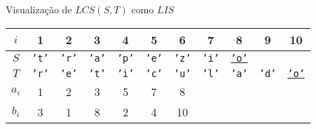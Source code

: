 \begin{frame}[fragile]{Visualização de $LCS(S, T)$ como $LIS$}

    \begin{table}
        \centering

        \begin{tabular}{c|cccccccccc} 
        \hline 
        $i$ & 1 & 2 & 3 & 4 & 5 & 6 & 7 & 8 & 9 & 10\\
        \hline
        $S$
        & {\textcolor{blue!80!black}{\texttt{'t'}}}
        & {\textcolor{blue!80!black}{\texttt{'r'}}}
        & {\textcolor{blue!80!black}{\texttt{'a'}}}
        & \textcolor{blue!80!black}{\texttt{'p'}}
        & {\textcolor{blue!80!black}{\texttt{'e'}}}
        & \textcolor{blue!80!black}{\texttt{'z'}}
        & {\textcolor{blue!80!black}{\texttt{'i'}}}
        & \underline{\textcolor{blue!80!black}{\texttt{'o'}}} \\
        $T$
        & {\textcolor{green!50!black}{\texttt{'r'}}}
        & {\textcolor{green!50!black}{\texttt{'e'}}}
        & \textcolor{green!50!black}{\texttt{'t'}}
        & {\textcolor{green!50!black}{\texttt{'i'}}}
        & \textcolor{green!50!black}{\texttt{'c'}}
        & \textcolor{green!50!black}{\texttt{'u'}}
        & \textcolor{green!50!black}{\texttt{'l'}}
        & {\textcolor{green!50!black}{\texttt{'a'}}}
        & \textcolor{green!50!black}{\texttt{'d'}}
        & \underline{\textcolor{green!50!black}{\texttt{'o'}}} \\
        $a_i$ & 1 & 2 & 3 & 5 & 7 & 8\\
        $b_i$ & 3 & 1 & 8 & 2 & 4 & 10\\
        \hline
        \end{tabular}

    \end{table}

\end{frame}

